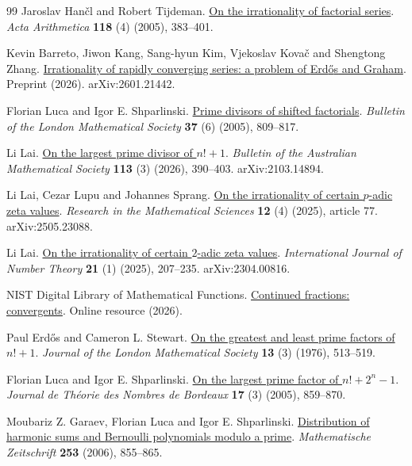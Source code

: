 \documentclass[11pt]{article}
\begin{document}
\begin{thebibliography}{99}
Jaroslav Han{\v c}l and Robert Tijdeman. \href{https://doi.org/10.4064/aa118-4-5}{On the irrationality of factorial series}.
\emph{Acta Arithmetica} \textbf{118} (4) (2005), 383--401.

Kevin Barreto, Jiwon Kang, Sang-hyun Kim, Vjekoslav Kova{\v c} and Shengtong Zhang. \href{https://arxiv.org/abs/2601.21442v3}{Irrationality of rapidly converging series: a problem of {Erd{\H o}s} and {Graham}}.
Preprint (2026). arXiv:2601.21442.

Florian Luca and Igor E. Shparlinski. \href{https://doi.org/10.1112/S0024609305004923}{Prime divisors of shifted factorials}.
\emph{Bulletin of the London Mathematical Society} \textbf{37} (6) (2005), 809--817.

Li Lai. \href{https://doi.org/10.1017/S0004972725100543}{On the largest prime divisor of {$n!+1$}}.
\emph{Bulletin of the Australian Mathematical Society} \textbf{113} (3) (2026), 390--403. arXiv:2103.14894.

Li Lai, Cezar Lupu and Johannes Sprang. \href{https://doi.org/10.1007/s40687-025-00559-x}{On the irrationality of certain {$p$}-adic zeta values}.
\emph{Research in the Mathematical Sciences} \textbf{12} (4) (2025), article 77. arXiv:2505.23088.

Li Lai. \href{https://doi.org/10.1142/S1793042125500113}{On the irrationality of certain {$2$}-adic zeta values}.
\emph{International Journal of Number Theory} \textbf{21} (1) (2025), 207--235. arXiv:2304.00816.

{NIST Digital Library of Mathematical Functions}. \href{https://dlmf.nist.gov/1.12}{Continued fractions: convergents}.
Online resource (2026).

Paul Erd{\H o}s and Cameron L. Stewart. \href{https://doi.org/10.1112/jlms/s2-13.3.513}{On the greatest and least prime factors of {$n!+1$}}.
\emph{Journal of the London Mathematical Society} \textbf{13} (3) (1976), 513--519.

Florian Luca and Igor E. Shparlinski. \href{https://doi.org/10.5802/jtnb.524}{On the largest prime factor of {$n!+2^n-1$}}.
\emph{Journal de Th{\'e}orie des Nombres de Bordeaux} \textbf{17} (3) (2005), 859--870.

Moubariz Z. Garaev, Florian Luca and Igor E. Shparlinski. \href{https://doi.org/10.1007/s00209-006-0939-5}{Distribution of harmonic sums and {Bernoulli} polynomials modulo a prime}.
\emph{Mathematische Zeitschrift} \textbf{253} (2006), 855--865.


\end{thebibliography}
\end{document}
